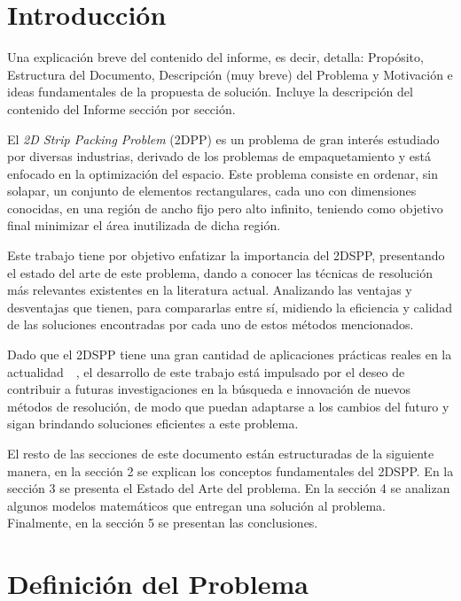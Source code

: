 \documentclass[letter, 10pt]{article}
\begin{document}
\section{Introducci\'on}

Una explicaci\'on breve del contenido del informe, es decir, detalla: Prop\'osito, Estructura del Documento, Descripci\'on (muy breve) del Problema y Motivaci\'on e ideas fundamentales de la propuesta de soluci\'on. Incluye la descripci\'on del contenido del Informe secci\'on por secci\'on.
\vspace{0.2cm}

El \emph{2D Strip Packing Problem} (2DPP) es un problema de gran inter\'es estudiado por diversas industrias, derivado de los problemas de empaquetamiento y est\'a enfocado en la optimizaci\'on del espacio. Este problema consiste en ordenar, sin solapar, un conjunto de elementos rectangulares, cada uno con dimensiones conocidas, en una regi\'on de ancho fijo pero alto infinito, teniendo como objetivo final minimizar el \'area inutilizada de dicha regi\'on.

Este trabajo tiene por objetivo enfatizar la importancia del 2DSPP, presentando el estado del arte de este problema, dando a conocer las t\'ecnicas de resoluci\'on m\'as relevantes existentes en la literatura actual. Analizando las ventajas y desventajas que tienen, para compararlas entre s\'i, midiendo la eficiencia y calidad de las soluciones encontradas por cada uno de estos m\'etodos mencionados.

Dado que el 2DSPP tiene una gran cantidad de aplicaciones pr\'acticas reales en la actualidad~\cite{junior2022rectangular}~\cite{vasilyev2023generalized}, el desarrollo de este trabajo est\'a impulsado por el deseo de contribuir a futuras investigaciones en la b\'usqueda e innovaci\'on de nuevos m\'etodos de resoluci\'on, de modo que puedan adaptarse a los cambios del futuro y sigan brindando soluciones eficientes a este problema.

El resto de las secciones de este documento est\'an estructuradas de la siguiente manera, en la secci\'on 2 se explican los conceptos fundamentales del 2DSPP. En la secci\'on 3 se presenta el Estado del Arte del problema. En la secci\'on 4 se analizan algunos modelos matem\'aticos que entregan una soluci\'on al problema. Finalmente, en la secci\'on 5 se presentan las conclusiones.

\section{Definici\'on del Problema}
\end{document}
